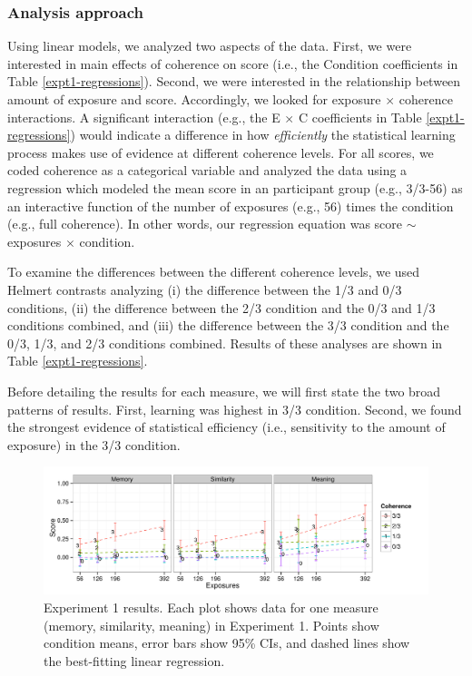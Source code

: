 \documentclass[man,floatsintext]{apa6}
\begin{document}
\subsubsection{Analysis approach}
Using linear models, we analyzed two aspects of the data. First, we were interested in main effects of coherence on score (i.e., the Condition coefficients in Table \ref{expt1-regressions}). Second, we were interested in the relationship between amount of exposure and score. Accordingly, we looked for exposure $\times$ coherence interactions. A significant interaction (e.g., the E $\times$ C coefficients in Table \ref{expt1-regressions}) would indicate a difference in how \emph{efficiently} the statistical learning process makes use of evidence at different coherence levels. For all scores, we coded coherence as a categorical variable and analyzed the data using a regression which modeled the mean score in an participant group (e.g., 3/3-56) as an interactive function of the number of exposures (e.g., 56) times the condition (e.g., full coherence). In other words, our regression equation was score $\sim$ exposures $\times$ condition.

To examine the differences between the different coherence levels, we used Helmert contrasts analyzing (i) the difference between the 1/3 and 0/3 conditions, (ii) the difference between the 2/3 condition and the 0/3 and 1/3 conditions combined, and (iii) the difference between the 3/3 condition and the 0/3, 1/3, and 2/3 conditions combined. Results of these analyses are shown in Table \ref{expt1-regressions}.

Before detailing the results for each measure, we will first state the two broad patterns of results. First, learning was highest in 3/3 condition. Second, we found the strongest evidence of statistical efficiency (i.e., sensitivity to the amount of exposure) in the 3/3 condition.

\begin{figure}[t]
  \begin{center}
    \includegraphics[width=1.0\linewidth]{x1}
    \caption{Experiment 1 results. Each plot shows data for one
measure (memory, similarity, meaning) in Experiment 1. Points show
condition means, error bars show 95\% CIs, and dashed lines show the
best-fitting linear regression.}
    \label{expt1-results}
  \end{center}
\end{figure}
\end{document}
